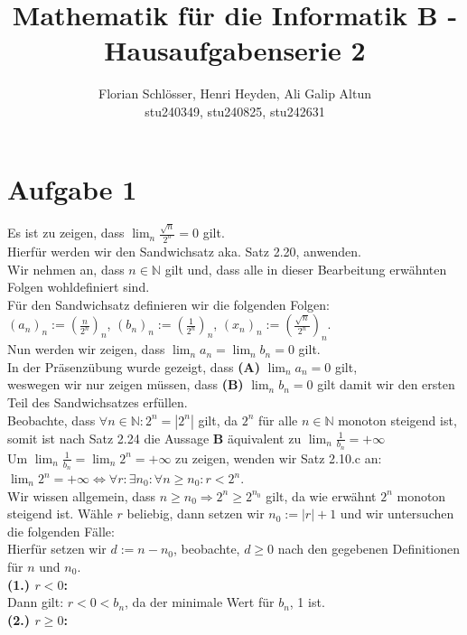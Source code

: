 \documentclass[12pt, a4paper]{article}
\title{Mathematik für die Informatik B - Hausaufgabenserie 2}
\author{Florian Schlösser, Henri Heyden, Ali Galip Altun \\ \small stu240349, stu240825, stu242631}
\date{}
\begin{document}
\maketitle

\doublespacing
\section*{Aufgabe 1}
Es ist zu zeigen, dass $\lim_{n}\frac{\sqrt{n}}{2^n} = 0$ gilt. \\
Hierfür werden wir den Sandwichsatz aka. Satz 2.20, anwenden. \\
Wir nehmen an, dass $n \in \mathbb{N}$ gilt und, dass alle in dieser Bearbeitung erwähnten Folgen wohldefiniert sind. \\
Für den Sandwichsatz definieren wir die folgenden Folgen: \\ $(a_n)_n := \left(\frac{n}{2^n}\right)_n$, $(b_n)_n := \left(\frac{1}{2^n}\right)_n$, $(x_n)_n := \left(\frac{\sqrt{n}}{2^n}\right)_n$.\\
Nun werden wir zeigen, dass $\lim_{n}a_n = \lim_{n}b_n = 0$ gilt. \\
In der Präsenzübung wurde gezeigt, dass \textbf{(A)} $\lim_{n}a_n = 0$ gilt, \\
weswegen wir nur zeigen müssen, dass \textbf{(B)} $\lim_{n}b_n = 0$ gilt damit wir den ersten Teil des Sandwichsatzes erfüllen. \\
Beobachte, dass $\forall n \in \mathbb N: 2^n = |2^n|$ gilt, da $2^n$ für alle $n \in \mathbb N$ monoton steigend ist, somit ist nach Satz 2.24 die Aussage \textbf{B} äquivalent zu $\lim_{n}\frac{1}{b_n} = +\infty$ \\
Um $\lim_{n}\frac{1}{b_n} = \lim_{n}2^n = +\infty$ zu zeigen, wenden wir Satz 2.10.c an: \\
$\lim_{n}2^n = +\infty \Longleftrightarrow \forall r: \exists n_0: \forall n \ge n_0: r < 2^n$. \\
Wir wissen allgemein, dass $n \ge n_0 \Rightarrow 2^n \ge 2^{n_0}$ gilt, da wie erwähnt $2^n$ monoton steigend ist.
Wähle $r$ beliebig, dann setzen wir $n_0 := |r| + 1$ und wir untersuchen die folgenden Fälle:\\
Hierfür setzen wir $d:= n - n_0$, beobachte, $d \ge 0$ nach den gegebenen Definitionen für $n$ und $n_0$. \\
\textbf{(1.) $r < 0$:} \\
Dann gilt: $r < 0 < b_n$, da der minimale Wert für $b_n$, 1 ist. \\
\textbf{(2.) $r \ge 0$:} \\
\end{document}

